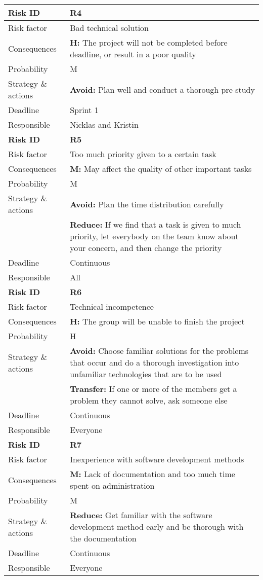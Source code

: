 \begin{longtable}{>{\setlength\hsize{.3\hsize}}X|>{\setlength\hsize{0.7\hsize}}X}
\textbf{Risk ID} & \textbf{R4} \\ \hline \hline
Risk factor & Bad technical solution                                                \\
Consequences & \textbf{H:} The project will not be completed before deadline, or result in a poor quality \\
Probability & M \\
Strategy \& actions & \textbf{Avoid:} Plan well and conduct a thorough pre-study \\
Deadline & Sprint 1 \\
Responsible & Nicklas and Kristin \\ \hline

\textbf{Risk ID} & \textbf{R5} \\ \hline \hline
Risk factor & Too much priority given to a certain task \\
Consequences & \textbf{M:} May affect the quality of other important tasks \\
Probability & M \\
Strategy \& actions & \textbf{Avoid:} Plan the time distribution carefully\\
 & \textbf{Reduce:} If we find that a task is given to much priority, let everybody on the team know about your concern, and then change the priority \\
Deadline & Continuous \\
Responsible & All \\ \hline

\newpage

\hline
\textbf{Risk ID} & \textbf{R6} \\ \hline \hline
Risk factor & Technical incompetence \\
Consequences & \textbf{H:} The group will be unable to finish the project \\
Probability & H \\
Strategy \& actions & \textbf{Avoid:} Choose familiar solutions for the problems that occur and do a thorough investigation into unfamiliar technologies that are to be used\\
 & \textbf{Transfer:} If one or more of the members get a problem they cannot solve, ask someone else \\
Deadline & Continuous \\
Responsible & Everyone \\ \hline

\textbf{Risk ID} & \textbf{R7} \\ \hline \hline
Risk factor & Inexperience with software development methods \\
Consequences & \textbf{M:} Lack of documentation and too much time spent on administration \\
Probability & M \\
Strategy \& actions & \textbf{Reduce:} Get familiar with the software development method early and be thorough with the documentation \\
Deadline & Continuous \\
Responsible & Everyone \\ \hline


\end{longtable}

